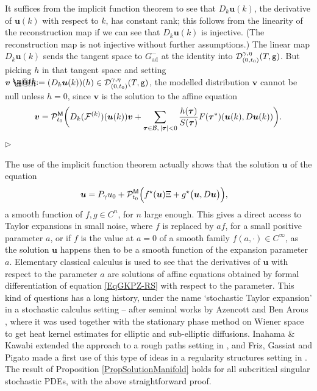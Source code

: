 \documentclass[10pt, reqno]{amsart}
\makeatletter
\numberwithin{subsection}{section}
\numberwithin{subsubsection}{subsection}
\numberwithin{equation}{section} %
\newenvironment{Dem}[1][\unskip]{%
    \begin{list}{\hspace{1.15cm}{\sf \textbf{{\small Proof #1 --}}}}{%
        \setlength{\topsep}{0pt}%
        \setlength{\leftmargin}{0pt}%
        \setlength{\rightmargin}{0pt}%
        \setlength{\listparindent}{0pt}%
        \setlength{\itemindent}{0pt}%
        \setlength{\parsep}{0pt}%
        \addtolength{\leftmargin}{0pt}%
        \addtolength{\rightmargin}{0pt}%
    } \item }{\hfill $\rhd$\end{list}\smallskip}
\newenvironment{Rem}[1][\unskip]{%
    \begin{list}{\hspace{1.15cm}{\textsf{\textbf{{\small \textsl{Remark}} 
--}}}}{%
        \setlength{\topsep}{0pt}%
        \setlength{\leftmargin}{0pt}%
        \setlength{\rightmargin}{0pt}%
        \setlength{\listparindent}{0pt}%
        \setlength{\itemindent}{0pt}%
        \setlength{\parsep}{0pt}%
        \addtolength{\leftmargin}{0pt}%
        \addtolength{\rightmargin}{0pt}%
    } \item }{\hfill \end{list}\smallskip}
\theoremstyle{mystyle}
\theoremstyle{mystyle2}
\theoremstyle{mystyle3}
\newcommand{\mcF}{\boldsymbol{p}}
\newcommand{\bsu}{\boldsymbol{u}}
\newcommand{\bsv}{\boldsymbol{v}}
\newcommand{\bstau}{\boldsymbol{\tau}}
\newcommand{\mcB}{\mathcal{B}}
\newcommand{\mcD}{\mathcal{D}}
\renewcommand{\mcF}{\mathcal{F}}
\newcommand{\mcP}{\mathcal{P}}
\newcommand*{\defeq}{\mathrel{\rlap{%
                     \raisebox{0.3ex}{$\m@th\cdot$}}%
                     \raisebox{-0.3ex}{$\m@th\cdot$}}%
                     =}
\makeatother
\begin{document}
\medskip

\begin{Dem}
It suffices from the implicit function theorem to see that $D_k\bsu(k)$, the derivative of $\bsu(k)$ with respect to $k$, has constant rank; this follows from the linearity of the reconstruction map if we can see that $D_k\bsu(k)$ is injective. (The reconstruction map is not injective without further assumptions.) The linear map $D_k\bsu(k)$ sends the tangent space to $G^-_{\textrm{ad}}$ at the identity into $\mcD^{\gamma,\eta}_{(0,t_0)}(T,\sf g)$. But picking $h$ in that tangent space and setting $\bsv \defeq  (D_k\bsu(k))(h)\in\mcD^{\gamma,\eta}_{(0,t_0)}(T,\sf g)$, the modelled distribution $\bsv$ cannot be null unless $h=0$, since $\bsv$ is the solution to the affine equation
$$
\bsv = \mcP_{t_0}^{\sf M}
\bigg(
D_k(\mcF^{(k)})(\bsu(k))\bsv + \sum_{\bstau\in\mcB,\,|\bstau|<0} \frac{h(\bstau)}{S(\bstau)}F(\bstau^*)(\bsu(k), D\bsu(k)  )
\bigg).
$$
\end{Dem}   

\medskip

\begin{Rem}
{\small The use of the implicit function theorem actually shows that the solution $\bsu$ of the equation
\begin{equation} \label{EqGKPZ-RS} \begin{split}
\bsu &= P_\gamma u_0+\mcP_{t_0}^{\sf M}\Big(f^\star(\bsu)\Xi + g^\star\big(\bsu,  D\bsu  \big) \Big) ,
\end{split} \end{equation}
a smooth function of $f,g\in C^n$, for $n$ large enough. This gives a direct access to Taylor expansions in small noise, where $f$ is replaced by $af$, for a small positive parameter $a$, or if $f$ is the value at $a=0$ of a smooth family $f(a,\cdot)\in C^\infty$, as the solution $\bsu$ happens then to be a smooth function of the expansion parameter $a$. Elementary classical calculus is used to see that the derivatives of $\bsu$ with respect to the parameter $a$ are solutions of affine equations obtained by formal differentiation of equation \eqref{EqGKPZ-RS} with respect to the parameter. This kind of questions has a long history, under the name `stochastic Taylor expansion' in a stochastic calculus setting -- after seminal works by Azencott \cite{Azencott} and Ben Arous \cite{BenArous}, where it was used together with the stationary phase method on Wiener space to get heat kernel estimates for elliptic and sub-elliptic diffusions. Inahama \& Kawabi extended the approach to a rough paths setting in \cite{InahamaKawabi}, and Friz, Gassiat and Pigato made a first use of this type of ideas in a regularity structures setting in \cite{FGP}. The result of Proposition \ref{PropSolutionManifold} holds for all subcritical singular stochastic PDEs, with the above straightforward proof.   }
\end{Rem}
\end{document}

